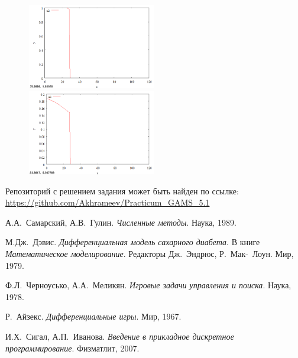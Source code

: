 \documentclass[14pt]{article}
\begin{document}
\begin{figure}
\begin{floatrow}
    {\includegraphics[width=0.5\textwidth]{task4_u2}}
    {\includegraphics[width=0.5\textwidth]{task4_u3}}
\end{floatrow}
\end{figure}

Репозиторий с решением задания может быть найден по ссылке:
\url{https://github.com/Akhrameev/Practicum_GAMS_5.1}

\newpage

\begin{thebibliography}{0}

 А.А.~Самарский, А.В.~Гулин.
\emph{Численные методы}. Наука, 1989.

 М.Дж.~Дэвис.
\emph{Дифференциальная модель сахарного диабета}.
В книге \emph{Математическое моделирование}. Редакторы Дж.~Эндрюс, Р.~Мак-~Лоун. Мир, 1979.

 Ф.Л.~Черноусько, А.А.~Меликян.
\emph{Игровые задачи управления и поиска}. Наука, 1978.

 Р.~Айзекс.
\emph{Дифференциальные игры}. Мир, 1967.

 И.Х.~Сигал, А.П.~Иванова.
\emph{Введение в прикладное дискретное программирование}. Физматлит, 2007.


\end{thebibliography}
\end{document}
